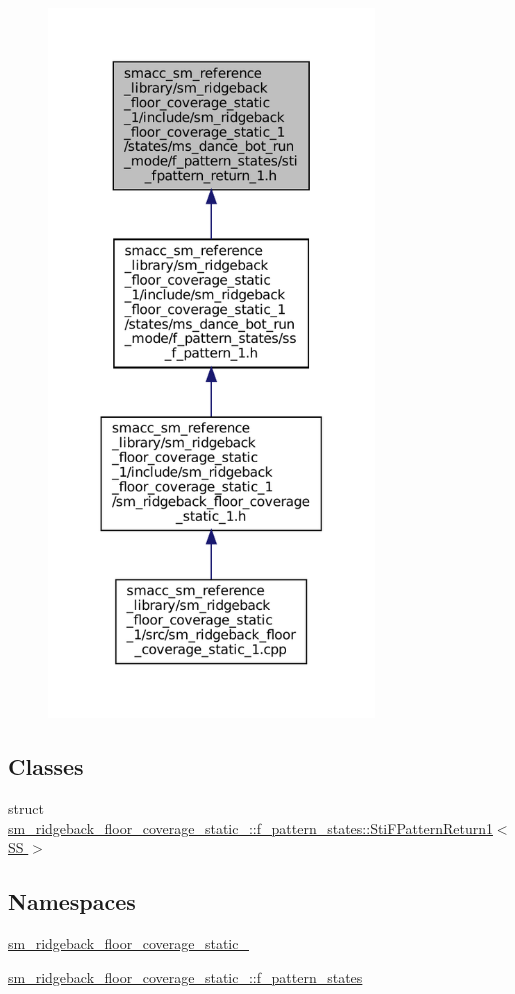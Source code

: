\begin{figure}[H]
\begin{center}
\leavevmode
\includegraphics[width=245pt]{sm__ridgeback__floor__coverage__static__1_2include_2sm__ridgeback__floor__coverage__static__1_2sd1da61ff74bd56f3f605a01971343d1c}
\end{center}
\end{figure}
\subsection*{Classes}
\begin{DoxyCompactItemize}
\item 
struct \hyperlink{classsm__ridgeback__floor__coverage__static__1_1_1f__pattern__states_1_1StiFPatternReturn1}{sm\+\_\+ridgeback\+\_\+floor\+\_\+coverage\+\_\+static\+\_\+::f\+\_\+pattern\+\_\+states\+::\+Sti\+F\+Pattern\+Return1$<$ S\+S $>$}
\end{DoxyCompactItemize}
\subsection*{Namespaces}
\begin{DoxyCompactItemize}
\item 
 \hyperlink{namespacesm__ridgeback__floor__coverage__static__1}{sm\+\_\+ridgeback\+\_\+floor\+\_\+coverage\+\_\+static\+\_}
\item 
 \hyperlink{namespacesm__ridgeback__floor__coverage__static__1_1_1f__pattern__states}{sm\+\_\+ridgeback\+\_\+floor\+\_\+coverage\+\_\+static\+\_\+::f\+\_\+pattern\+\_\+states}
\end{DoxyCompactItemize}
